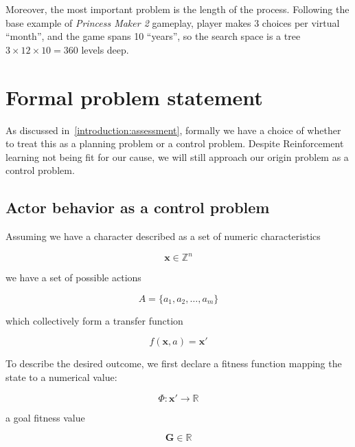 \documentclass[11pt, a4paper]{article}
\begin{document}
	Moreover, the most important problem is the length of the process.
	Following the base example of \textit{Princess Maker 2} gameplay, player makes 3 choices per virtual ``month'', and the game spans 10 ``years'', so the search space is a tree $3 \times 12 \times 10 = 360$ levels deep.
	
	\section{Formal problem statement}\label{problem-statement}

	As discussed in~\ref{introduction:assessment}, formally we have a choice of whether to treat this as a planning problem or a control problem.
	Despite Reinforcement learning not being fit for our cause, we will still approach our origin problem as a control problem.

	\subsection{Actor behavior as a control problem}

	Assuming we have a character described as a set of numeric characteristics
	
	\begin{equation}
		\mathbf{x} \in \mathbb{Z}^n
	\end{equation}
	
	we have a set of possible actions
	
	\begin{equation}
		A = \{a_1, a_2,\ldots, a_m\}
	\end{equation}
	
	which collectively form a transfer function
	
	\begin{equation}\label{definitions:transfer-function}
		f(\mathbf{x}, a) = \mathbf{x}'
	\end{equation}

	To describe the desired outcome, we first declare a fitness function mapping the state to a numerical value:
	
	\begin{equation}
		\Phi : \mathbf{x}' \rightarrow \mathbb{R}
	\end{equation} 
	
	a goal fitness value 
	
	\begin{equation}
		\mathbf{G} \in \mathbb{R}
	\end{equation}
	
\end{document}

